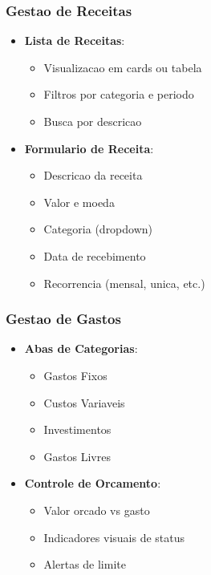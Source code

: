 \subsubsection{Gestao de Receitas}
\begin{itemize}
    \item \textbf{Lista de Receitas}:
    \begin{itemize}
        \item Visualizacao em cards ou tabela
        \item Filtros por categoria e periodo
        \item Busca por descricao
    \end{itemize}
    \item \textbf{Formulario de Receita}:
    \begin{itemize}
        \item Descricao da receita
        \item Valor e moeda
        \item Categoria (dropdown)
        \item Data de recebimento
        \item Recorrencia (mensal, unica, etc.)
    \end{itemize}
\end{itemize}

\subsubsection{Gestao de Gastos}
\begin{itemize}
    \item \textbf{Abas de Categorias}:
    \begin{itemize}
        \item Gastos Fixos
        \item Custos Variaveis
        \item Investimentos
        \item Gastos Livres
    \end{itemize}
    \item \textbf{Controle de Orcamento}:
    \begin{itemize}
        \item Valor orcado vs gasto
        \item Indicadores visuais de status
        \item Alertas de limite
    \end{itemize}
\end{itemize}

